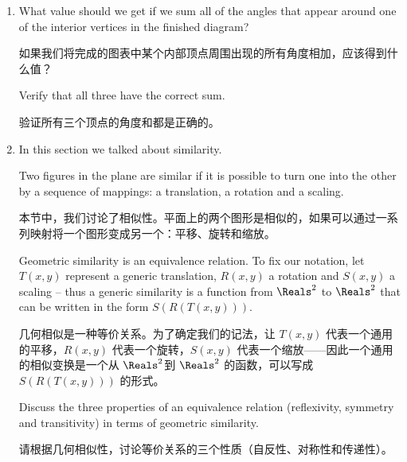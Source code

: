 \begin{enumerate}
    \item What value should we get if we sum all of the
    angles that appear around one of the interior vertices in the 
    finished diagram?

    如果我们将完成的图表中某个内部顶点周围出现的所有角度相加，应该得到什么值？
    
    Verify that all three have the correct sum.
    
    验证所有三个顶点的角度和都是正确的。
    
    \begin{center}
    
    \end{center}
    
    \wbvfill
    
    \workbookpagebreak
    
    \item In this section we talked about similarity.
 
    Two figures in 
    the plane are 
    similar if it is possible to turn one into the other
    by a sequence of mappings: a translation, a rotation and a scaling.

    本节中，我们讨论了相似性。平面上的两个图形是相似的，如果可以通过一系列映射将一个图形变成另一个：平移、旋转和缩放。

    Geometric similarity is an equivalence relation.
    To fix our
    notation, let $T(x,y)$ represent a generic translation, $R(x,y)$ a rotation
    and $S(x,y)$ a scaling -- thus a generic similarity is a function from
    $\Reals^2$ to $\Reals^2$ that can be written in the form $S(R(T(x,y)))$.

    几何相似是一种等价关系。为了确定我们的记法，让 $T(x,y)$ 代表一个通用的平移，$R(x,y)$ 代表一个旋转，$S(x,y)$ 代表一个缩放——因此一个通用的相似变换是一个从 $\Reals^2$到 $\Reals^2$ 的函数，可以写成 $S(R(T(x,y)))$ 的形式。
    
    Discuss the three properties of an equivalence relation (reflexivity, symmetry and transitivity) in terms of geometric similarity.

    请根据几何相似性，讨论等价关系的三个性质（自反性、对称性和传递性）。
    \wbvfill
    
    \end{enumerate}
    
